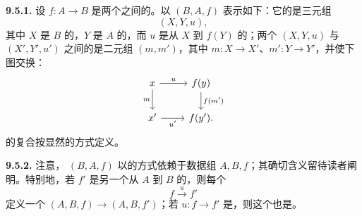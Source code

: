 \textbf{9.5.1.} 设 $f:A\to B$ 是两个之间的。以 $(B,A,f)$ 表示如下：它的是三元组
\[
(X,Y,u),
\]
其中 $X$ 是 $B$ 的，$Y$ 是 $A$ 的，而 $u$ 是从 $X$ 到 $f(Y)$ 的；两个 $(X,Y,u)$ 与 $(X',Y',u')$ 之间的是二元组 $(m,m')$，其中 $m:X\to X'$、$m':Y\to Y'$，并使下图交换：
\[
\begin{tikzcd}
x\arrow[r,"u"]\arrow[d,"m"']&f(y)\arrow[d,"f(m')"]\\
x'\arrow[r,"u'"']&f(y').
\end{tikzcd}
\]
的复合按显然的方式定义。

\textbf{9.5.2.} 注意， $(B,A,f)$ 以的方式依赖于数据组 $A,B,f$；其确切含义留待读者阐明。特别地，若 $f'$ 是另一个从 $A$ 到 $B$ 的，则每个
\[
f\xrightarrow{u}f'
\]
定义一个 $(A,B,f)\to(A,B,f')$；若 $u:f\to f'$ 是，则这个也是。

